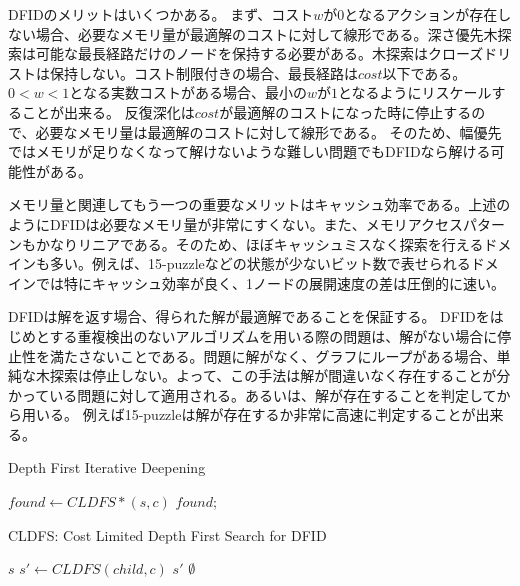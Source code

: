 DFIDのメリットはいくつかある。
まず、コスト$w$が0となるアクションが存在しない場合、必要なメモリ量が最適解のコストに対して線形である。深さ優先木探索は可能な最長経路だけのノードを保持する必要がある。木探索はクローズドリストは保持しない。コスト制限付きの場合、最長経路は$cost$以下である。$0<w<1$となる実数コストがある場合、最小の$w$が$1$となるようにリスケールすることが出来る。 反復深化は$cost$が最適解のコストになった時に停止するので、必要なメモリ量は最適解のコストに対して線形である。
そのため、幅優先ではメモリが足りなくなって解けないような難しい問題でもDFIDなら解ける可能性がある。

メモリ量と関連してもう一つの重要なメリットはキャッシュ効率である。上述のようにDFIDは必要なメモリ量が非常にすくない。また、メモリアクセスパターンもかなりリニアである。そのため、ほぼキャッシュミスなく探索を行えるドメインも多い。例えば、15-puzzleなどの状態が少ないビット数で表せられるドメインでは特にキャッシュ効率が良く、1ノードの展開速度の差は圧倒的に速い\cite{korf:85a}。

DFIDは解を返す場合、得られた解が最適解であることを保証する。
DFIDをはじめとする重複検出のないアルゴリズムを用いる際の問題は、解がない場合に停止性を満たさないことである。問題に解がなく、グラフにループがある場合、単純な木探索は停止しない。よって、この手法は解が間違いなく存在することが分かっている問題に対して適用される。あるいは、解が存在することを判定してから用いる。
例えば15-puzzleは解が存在するか非常に高速に判定することが出来る。

\begin{algorithm}
\caption{Depth First Iterative Deepening}
\label{alg:depth-first-iterative-deepening}
	 {
		$found \leftarrow CLDFS*(s, c)$\;
		 {
			\Return $found$;
		}
	}
\end{algorithm}

\begin{algorithm}
\caption{CLDFS: Cost Limited Depth First Search for DFID}
\label{alg:cldfs}
	 {
		\Return $s$\;
	}
	 {
		 {
			$s' \leftarrow CLDFS(child, c)$
			 {
				\Return $s'$
			}
		}
	}
	\Return $\emptyset$\;
\end{algorithm}



